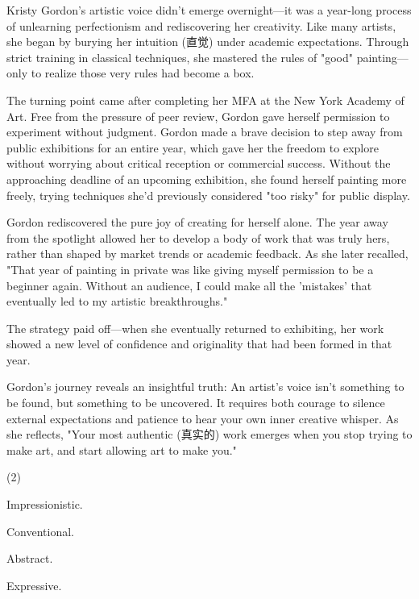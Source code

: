 \documentclass{英语试卷}
\begin{document}
\par Kristy Gordon's artistic voice didn't emerge overnight—it was a year-long process of unlearning perfectionism and rediscovering her creativity. Like many artists, she began by burying her intuition (直觉) under academic expectations. Through strict training in classical techniques, she mastered the rules of "good" painting—only to realize those very rules had become a box.\par
\par The turning point came after completing her MFA at the New York Academy of Art. Free from the pressure of peer review, Gordon gave herself permission to experiment without judgment. Gordon made a brave decision to step away from public exhibitions for an entire year, which gave her the freedom to explore without worrying about critical reception or commercial success. Without the approaching deadline of an upcoming exhibition, she found herself painting more freely, trying techniques she'd previously considered "too risky" for public display.\par
\par Gordon rediscovered the pure joy of creating for herself alone. The year away from the spotlight allowed her to develop a body of work that was truly hers, rather than shaped by market trends or academic feedback. As she later recalled, "That year of painting in private was like giving myself permission to be a beginner again. Without an audience, I could make all the 'mistakes' that eventually led to my artistic breakthroughs."\par
\par The strategy paid off—when she eventually returned to exhibiting, her work showed a new level of confidence and originality that had been formed in that year.\par
\par Gordon's journey reveals an insightful truth: An artist's voice isn't something to be found, but something to be uncovered. It requires both courage to silence external expectations and patience to hear your own inner creative whisper. As she reflects, "Your most authentic (真实的) work emerges when you stop trying to make art, and start allowing art to make you."\par
{}
\begin{choices}(2)
  \item Impressionistic.
  \item Conventional.
  \item Abstract.
  \item Expressive.
\end{choices}
\end{document}
